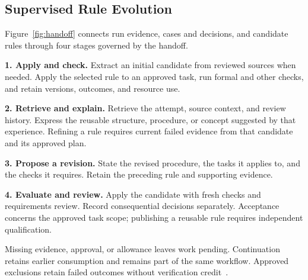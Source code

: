 \subsection{Supervised Rule Evolution}
\label{sec:handoff}
Figure~\ref{fig:handoff} connects run evidence, cases and decisions, and candidate rules through four stages governed by the handoff.

\textbf{1. Apply and check.} Extract an initial candidate from reviewed sources when needed. Apply the selected rule to an approved task, run formal and other checks, and retain versions, outcomes, and resource use.

\textbf{2. Retrieve and explain.} Retrieve the attempt, source context, and review history. Express the reusable structure, procedure, or concept suggested by that experience. Refining a rule requires current failed evidence from that candidate and its approved plan.

\textbf{3. Propose a revision.} State the revised procedure, the tasks it applies to, and the checks it requires. Retain the preceding rule and supporting evidence.

\textbf{4. Evaluate and review.} Apply the candidate with fresh checks and requirements review. Record consequential decisions separately. Acceptance concerns the approved task scope; publishing a reusable rule requires independent qualification.

Missing evidence, approval, or allowance leaves work pending. Continuation retains earlier consumption and remains part of the same workflow. Approved exclusions retain failed outcomes without verification credit~\cite{scpCheckpoint}.
